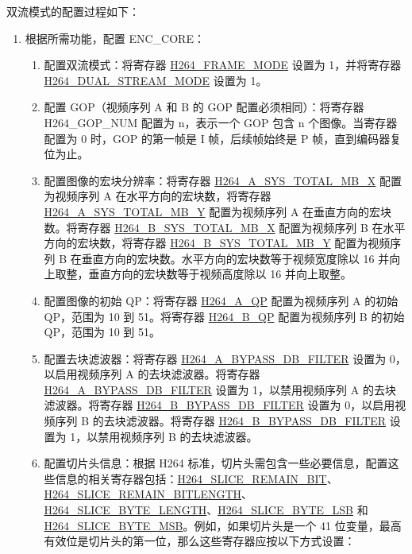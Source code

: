 \documentclass[main\_\_CN.tex]{subfiles}
\begin{document}
双流模式的配置过程如下：
\begin{enumerate}
    \item\label{item:h264-dual-cfg} 根据所需功能，配置 ENC\_CORE：
    \begin{enumerate}
        \item 配置双流模式：将寄存器 \hyperref[fielddesc:H264FRAMEMODE]{H264\_FRAME\_MODE} 设置为 1，并将寄存器 \hyperref[fielddesc:H264DUALSTREAMMODE]{H264\_DUAL\_STREAM\_MODE} 设置为 1。
        \item 配置 GOP（视频序列 A 和 B 的 GOP 配置必须相同）：将寄存器H264\_GOP\_NUM 配置为 n，表示一个 GOP 包含 n 个图像。当寄存器配置为 0 时，GOP 的第一帧是 I 帧，后续帧始终是 P 帧，直到编码器复位为止。
        \item 配置图像的宏块分辨率：将寄存器 \hyperref[fielddesc:H264ASYSTOTALMBX]{H264\_A\_SYS\_TOTAL\_MB\_X} 配置为视频序列 A 在水平方向的宏块数，将寄存器 \hyperref[fielddesc:H264ASYSTOTALMBY]{H264\_A\_SYS\_TOTAL\_MB\_Y} 配置为视频序列 A 在垂直方向的宏块数。将寄存器 \hyperref[fielddesc:H264BSYSTOTALMBX]{H264\_B\_SYS\_TOTAL\_MB\_X} 配置为视频序列 B 在水平方向的宏块数，将寄存器 \hyperref[fielddesc:H264BSYSTOTALMBY]{H264\_B\_SYS\_TOTAL\_MB\_Y} 配置为视频序列 B 在垂直方向的宏块数。水平方向的宏块数等于视频宽度除以 16 并向上取整，垂直方向的宏块数等于视频高度除以 16 并向上取整。
        \item 配置图像的初始 QP：将寄存器 \hyperref[fielddesc:H264AQP]{H264\_A\_QP} 配置为视频序列 A 的初始 QP，范围为 10 到 51。将寄存器 \hyperref[fielddesc:H264BQP]{H264\_B\_QP} 配置为视频序列 B 的初始 QP，范围为 10 到 51。
        \item 配置去块滤波器：将寄存器 \hyperref[fielddesc:H264ABYPASSDBFILTER]{H264\_A\_BYPASS\_DB\_FILTER} 设置为 0，以启用视频序列 A 的去块滤波器。将寄存器 \hyperref[fielddesc:H264ABYPASSDBFILTER]{H264\_A\_BYPASS\_DB\_FILTER} 设置为 1，以禁用视频序列 A 的去块滤波器。将寄存器 \hyperref[fielddesc:H264BBYPASSDBFILTER]{H264\_B\_BYPASS\_DB\_FILTER} 设置为 0，以启用视频序列 B 的去块滤波器。将寄存器 \hyperref[fielddesc:H264BBYPASSDBFILTER]{H264\_B\_BYPASS\_DB\_FILTER} 设置为 1，以禁用视频序列 B 的去块滤波器。
        \item 配置切片头信息：根据 H264 标准，切片头需包含一些必要信息，配置这些信息的相关寄存器包括：\hyperref[fielddesc:H264SLICEREMAINBIT]{H264\_SLICE\_REMAIN\_BIT}、\hyperref[fielddesc:H264SLICEREMAINBITLENGTH]{H264\_SLICE\_REMAIN\_BITLENGTH}、\hyperref[fielddesc:H264SLICEBYTELENGTH]{H264\_SLICE\_BYTE\_LENGTH}、\hyperref[fielddesc:H264SLICEBYTELSB]{H264\_SLICE\_BYTE\_LSB} 和 \hyperref[fielddesc:H264SLICEBYTEMSB]{H264\_SLICE\_BYTE\_MSB}。例如，如果切片头是一个 41 位变量，最高有效位是切片头的第一位，那么这些寄存器应按以下方式设置：

\end{enumerate}
\end{enumerate}
\end{document}
